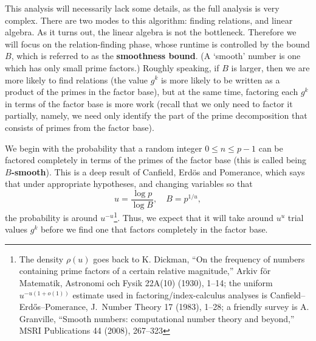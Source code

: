 \documentclass{article}
\theoremstyle{plain}
\theoremstyle{definition}
\theoremstyle{remark}
\numberwithin{theorem}{section}
\begin{document}
This analysis will necessarily lack some details, as the full analysis is very complex.  
There are two modes to this algorithm:  finding relations, and linear algebra.  As it turns out, the linear algebra is not the bottleneck.  Therefore we will focus on the relation-finding phase, whose runtime is controlled by the bound $B$, which is referred to as the \textbf{smoothness bound}.  (A `smooth' number is one which has only small prime factors.)  Roughly speaking, if $B$ is larger, then we are more likely to find relations (the value $g^k$ is more likely to be written as a product of the primes in the factor base), but at the same time, factoring each $g^k$ in terms of the factor base is more work (recall that we only need to factor it partially, namely, we need only identify the part of the prime decomposition that consists of primes from the factor base). 

We begin with the probability that a random integer $0 \le n \le p-1$ can be factored completely in terms of the primes of the factor base (this is called being \textbf{$B$-smooth}).  This is a deep result of Canfield, Erd\"os and Pomerance, which says that under appropriate hypotheses, and changing variables so that
\[
	u = \frac{\log p}{\log B}, \quad B = p^{1/u},
\]
the probability is around $u^{-u}$\footnote{The density $\rho(u)$ goes back to K. Dickman, ``On the frequency of numbers containing prime factors of a certain relative magnitude,'' Arkiv f\"or Matematik, Astronomi och Fysik 22A(10) (1930), 1--14; the uniform $u^{-u(1+o(1))}$ estimate used in factoring/index-calculus analyses is Canfield--Erd\H{o}s--Pomerance, J.~Number Theory 17 (1983), 1--28; a friendly survey is A. Granville, ``Smooth numbers: computational number theory and beyond,'' MSRI Publications 44 (2008), 267--323}.  Thus, we expect that it will take around $u^u$ trial values $g^k$ before we find one that factors completely in the factor base.
\end{document}
